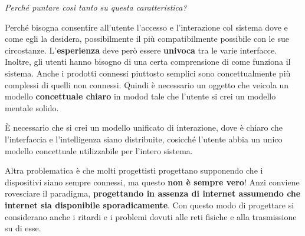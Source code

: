 \documentclass[a4paper,11pt,oneside]{book}
\begin{document}
\begin{flushleft}
	\textit{Perché puntare così tanto su
		questa caratteristica?}
\end{flushleft}

Perché bisogna consentire all'utente l'accesso e l'interazione col sistema dove e come egli la desidera, possibilmente il più compatibilmente possibile con le sue circostanze. L'\textbf{esperienza} deve però essere \textbf{univoca} tra le varie interfacce. Inoltre, gli utenti hanno bisogno di una certa comprensione di come funziona il sistema. Anche i prodotti connessi piuttosto semplici sono concettualmente più complessi di quelli non connessi. Quindi è necessario un oggetto che veicola un modello \textbf{concettuale chiaro} in modod tale che l'utente si crei un modello mentale solido.

È necessario che si crei  un
modello unificato di interazione, dove è chiaro che l'interfaccia e l'intelligenza siano distribuite, cosicché l'utente abbia un unico modello concettuale utilizzabile per l'intero sistema.

Altra problematica è che molti progettisti progettano supponendo che i dispositivi siano sempre connessi, ma questo \textbf{non è sempre vero}! Anzi conviene rovesciare il paradigma, \textbf{progettando in assenza di internet assumendo che internet sia disponibile sporadicamente}. Con questo modo di progettare si considerano anche i ritardi e i problemi dovuti alle reti fisiche e alla trasmissione su di esse.
\end{document}
